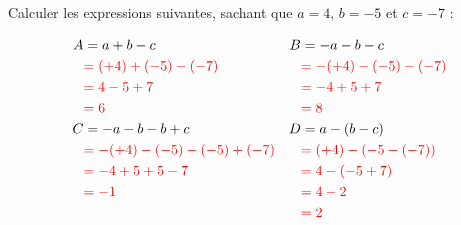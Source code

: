 \documentclass[Controlev1-correction]{subfiles}
\begin{document}
\begin{exercice}[(6 points)]

	Calculer les expressions suivantes, sachant que $a = 4$, $b = -5$ et $c = -7$ :

	\begin{align*}
		A & = a + b - c                               & B & = -a - b - c                       \\
		  & \correction{= (+4) + (-5) - (-7)}         &   & \correction{= -(+4) - (-5) - (-7)} \\
		  & \correction{= 4 - 5 + 7}                  &   & \correction{= -4 + 5 + 7}          \\
		  & \correction{= 6}                          &   & \correction{= 8}                   \\
		C & = -a - b - b + c                          & D & = a - (b - c)                      \\
		  & \correction{= -(+4) - (-5) - (-5) + (-7)} &   & \correction{= (+4) - (-5 - (-7))}  \\
		  & \correction{= -4 + 5 + 5 - 7}             &   & \correction{= 4 - (-5 + 7)}        \\
		  & \correction{= -1}                         &   & \correction{= 4 - 2}               \\
		  &                                           &   & \correction{= 2}                   \\
	\end{align*}
\end{exercice}
\end{document}
